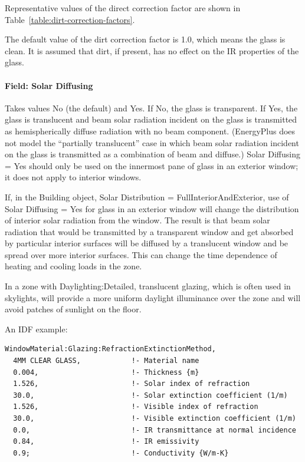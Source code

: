 Representative values of the direct correction factor are shown in Table~\ref{table:dirt-correction-factors}.

The default value of the dirt correction factor is 1.0, which means the glass is clean. It is assumed that dirt, if present, has no effect on the IR properties of the glass.

\paragraph{Field: Solar Diffusing}\label{field-solar-diffusing-1}

Takes values No (the default) and Yes. If No, the glass is transparent. If Yes, the glass is translucent and beam solar radiation incident on the glass is transmitted as hemispherically diffuse radiation with no beam component. (EnergyPlus does not model the ``partially translucent'' case in which beam solar radiation incident on the glass is transmitted as a combination of beam and diffuse.) Solar Diffusing = Yes should only be used on the innermost pane of glass in an exterior window; it does not apply to interior windows.

If, in the Building object, Solar Distribution = FullInteriorAndExterior, use of Solar Diffusing = Yes for glass in an exterior window will change the distribution of interior solar radiation from the window. The result is that beam solar radiation that would be transmitted by a transparent window and get absorbed by particular interior surfaces will be diffused by a translucent window and be spread over more interior surfaces. This can change the time dependence of heating and cooling loads in the zone.

In a zone with Daylighting:Detailed, translucent glazing, which is often used in skylights, will provide a more uniform daylight illuminance over the zone and will avoid patches of sunlight on the floor.

An IDF example:

\begin{lstlisting}
WindowMaterial:Glazing:RefractionExtinctionMethod,
  4MM CLEAR GLASS,            !- Material name
  0.004,                      !- Thickness {m}
  1.526,                      !- Solar index of refraction
  30.0,                       !- Solar extinction coefficient (1/m)
  1.526,                      !- Visible index of refraction
  30.0,                       !- Visible extinction coefficient (1/m)
  0.0,                        !- IR transmittance at normal incidence
  0.84,                       !- IR emissivity
  0.9;                        !- Conductivity {W/m-K}
\end{lstlisting}

